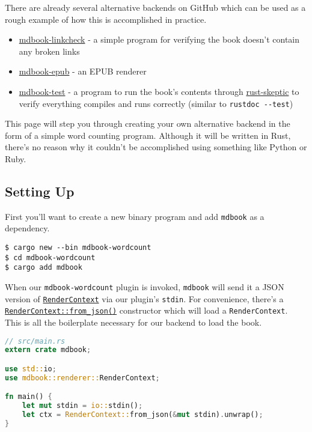 \documentclass{article}
\begin{document}
There are already several alternative backends on GitHub which can be used as a
rough example of how this is accomplished in practice.\\
\begin{itemize}
\item \href{https://github.com/Michael-F-Bryan/mdbook-linkcheck}{mdbook-linkcheck} - a simple program for verifying the book doesn't contain
any broken links
\item \href{https://github.com/Michael-F-Bryan/mdbook-epub}{mdbook-epub} - an EPUB renderer
\item \href{https://github.com/Michael-F-Bryan/mdbook-test}{mdbook-test} - a program to run the book's contents through \href{https://github.com/budziq/rust-skeptic}{rust-skeptic} to
verify everything compiles and runs correctly (similar to \lstinline|rustdoc --test|)
\end{itemize}

This page will step you through creating your own alternative backend in the form
of a simple word counting program. Although it will be written in Rust, there's
no reason why it couldn't be accomplished using something like Python or Ruby.\\

\subsection{Setting Up}
\label{Setting Up}
\label{setting-up}

First you'll want to create a new binary program and add \lstinline|mdbook| as a
dependency.\\
\begin{lstlisting}[language=shell]
$ cargo new --bin mdbook-wordcount
$ cd mdbook-wordcount
$ cargo add mdbook

\end{lstlisting}

When our \lstinline|mdbook-wordcount| plugin is invoked, \lstinline|mdbook| will send it a JSON
version of \href{https://docs.rs/mdbook/*/mdbook/renderer/struct.RenderContext.html}{\lstinline|RenderContext|} via our plugin's \lstinline|stdin|. For convenience, there's
a \href{https://docs.rs/mdbook/*/mdbook/renderer/struct.RenderContext.html#method.from_json}{\lstinline|RenderContext::from_json()|} constructor which will load a \lstinline|RenderContext|.\\

This is all the boilerplate necessary for our backend to load the book.\\
\begin{lstlisting}[language=rust]
// src/main.rs
extern crate mdbook;

use std::io;
use mdbook::renderer::RenderContext;

fn main() {
    let mut stdin = io::stdin();
    let ctx = RenderContext::from_json(&mut stdin).unwrap();
}

\end{lstlisting}
\end{document}
